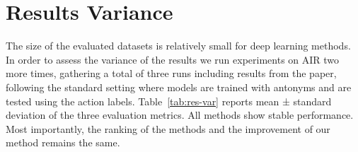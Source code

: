\documentclass[10pt,twocolumn,letterpaper]{article}
\begin{document}
\vspace{-5pt}
\section{Results Variance}

\begin{table}[t]
\caption{Results variance on AIR. Numbers indicate mean ± std.\vspace{-10pt}}
\label{tab:res-var}
\end{table}

The size of the evaluated datasets is relatively small for deep learning methods. In order to assess the variance of the results we run experiments on AIR two more times, gathering a total of three runs including results from the paper, following the standard setting where models are trained with antonyms and are tested using the action labels. Table~\ref{tab:res-var} reports mean ± standard deviation of the three evaluation metrics. All methods show stable performance. Most importantly, the ranking of the methods and the improvement of our method remains the same.
\end{document}
